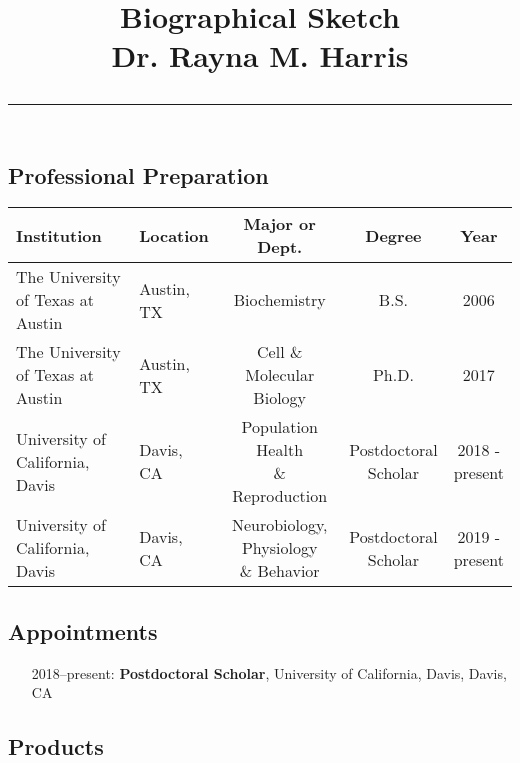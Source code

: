 \documentclass[svgnames,11pt]{article}
\title{%
        \vspace{-2\baselineskip}
            \normalsize
            Biographical Sketch\\
            {\large\textbf{Dr. Rayna M. Harris}}\\
            \vspace{0.5\baselineskip}
            \hrule
            \vspace{0.5\baselineskip}
        \vspace{-1.5ex}
        }
\date{}
\author{}
\begin{document}
\maketitle
\vspace{-4\baselineskip}

\subsection{Professional Preparation}

\begin{table}[h]
\begin{tabular}{llccc}
\hline
\textbf{Institution} & \textbf{Location} & \textbf{Major or Dept.} & \textbf{Degree} & \textbf{Year} \\
\hline
The University of Texas at Austin & Austin, TX & Biochemistry & B.S. & 2006 \\
The University of Texas at Austin & Austin, TX & Cell \& Molecular Biology & Ph.D. & 2017 \\
University of California, Davis & Davis, CA & \makecell{Population Health \\ \& Reproduction} & \makecell{Postdoctoral \\ Scholar} & \makecell{2018 - \\ present} \\
University of California, Davis & Davis, CA & \makecell{Neurobiology, Physiology \\ \& Behavior} & \makecell{Postdoctoral \\ Scholar} & \makecell{2019 - \\ present} \\ \hline
\end{tabular}
\end{table}      

\subsection{Appointments}

\begin{itemize}[label={--9999:},leftmargin=*,itemsep=0pt]

    \item[2018--present:]
        \textbf{Postdoctoral Scholar},
        University of California, Davis,
        Davis, CA

\end{itemize}

\subsection{Products}
\end{document}

